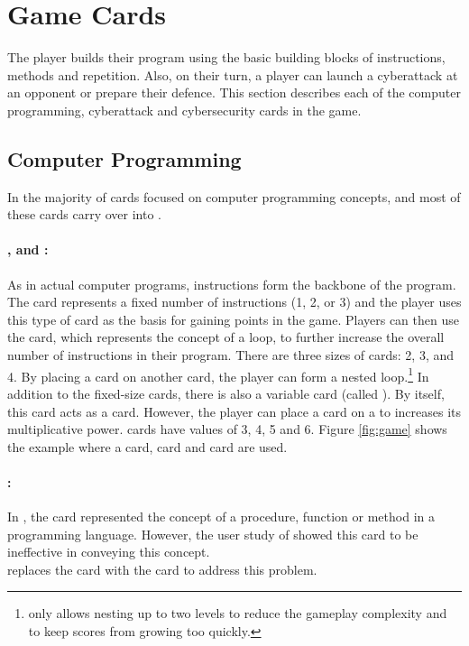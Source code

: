 \section{Game Cards}
The player builds their program using the basic building blocks of instructions, methods and repetition. Also, on their turn, a player can launch a cyberattack at an opponent or prepare their defence. This section describes each of the computer programming, cyberattack and cybersecurity cards in the game.

\subsection{Computer Programming}
In \pwOne the majority of cards focused on computer programming concepts, and most of these cards carry over into \pwTwoNS. 

\paragraph{\Ins, \R and \Vns:}As in actual computer programs, instructions form the backbone of the program. The \I card represents a fixed number of instructions (1, 2, or 3) and the player uses this type of card as the basis for gaining points in the game. Players can then use the \R card, which represents the concept of a loop, to further increase the overall number of instructions in their program. There are three sizes of \R cards: 2, 3, and 4. By placing a \R card on another \R card, the player can form a nested loop.\footnote{\gameName only allows nesting up to two levels to reduce the gameplay complexity and to keep scores from growing too quickly.} In addition to the fixed-size \R cards, there is also a variable \R card (called \Rxns). By itself, this card acts as a  card. However, the player can place a \V card on a \Rx to increases its multiplicative power. \V cards have values of 3, 4, 5 and 6. Figure \ref{fig:game} shows the example where a \M card, \R card and \V card are used.

\paragraph{\Mns:}
In \pwOneNS, the \Gr card represented the concept of a procedure, function or method in a programming language. However, the user study of \pwOne showed this card to be ineffective in conveying this concept. \pwTwo\\ replaces the \Gr card with the \M card to address this problem.

